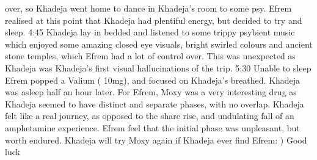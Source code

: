 \documentclass[12pt]{book}
\begin{document}
over, so Khadeja went home to dance in Khadeja's room to some psy. Efrem realised at this point that Khadeja had plentiful energy, but decided to try and sleep. 4:45 Khadeja lay in bedded and listened to some trippy psybient music which enjoyed some amazing closed eye visuals, bright swirled colours and ancient stone temples, which Efrem had a lot of control over. This was unexpected as Khadeja was Khadeja's first visual hallucinations of the trip. 5:30 Unable to sleep Efrem popped a Valium ( 10mg), and focused on Khadeja's breathed. Khadeja was asleep half an hour later. For Efrem, Moxy was a very interesting drug as Khadeja seemed to have distinct and separate phases, with no overlap. Khadeja felt like a real journey, as opposed to the share rise, and undulating fall of an amphetamine experience. Efrem feel that the initial phase was unpleasant, but worth endured. Khadeja will try Moxy again if Khadeja ever find Efrem: ) Good luck
\end{document}
